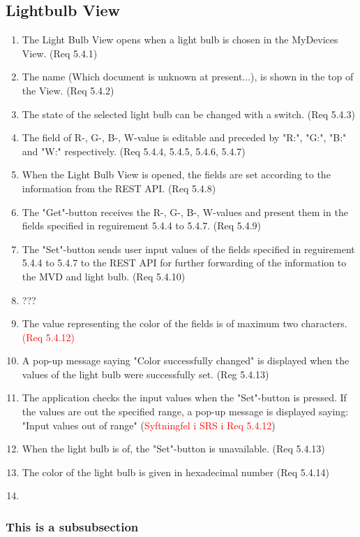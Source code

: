 \documentclass[a4paper]{article}
\newlength{\testlabellength}
\newenvironment{testlist}{\begin{enumerate}[label=\bfseries Test \thesubsection.\arabic* , labelindent=0pt, labelwidth=\testlabellength , leftmargin=2cm]}{\end{enumerate}}
\begin{document}
\begin{appendices}
\subsection{Lightbulb View}
\begin{testlist}
	\item The Light Bulb View opens when a light bulb is chosen in the MyDevices View. (Req 5.4.1)
    \item The name (Which document is unknown at present...), is shown in the top of the View. (Req 5.4.2)
    \item The state of the selected light bulb can be changed with a switch. (Req 5.4.3)
    \item The field of R-, G-, B-, W-value is editable and preceded by "R:", "G:", "B:" and "W:" respectively. (Req 5.4.4, 5.4.5, 5.4.6, 5.4.7) 
    \item When the Light Bulb View is opened, the fields are set according to the information from the REST API. (Req 5.4.8)
    \item The "Get"-button receives the R-, G-, B-, W-values and present them in the fields specified in reguirement 5.4.4 to 5.4.7. (Req 5.4.9)
    \item The "Set"-button sends user input values of the fields specified in reguirement 5.4.4 to 5.4.7 to the REST API for further forwarding of the information to the MVD and light bulb. (Req 5.4.10)
    \item ???
    \item The value representing the color of the fields is of maximum two characters. \textcolor{red}{(Req 5.4.12)}
    \item A pop-up message saying "Color successfully changed" is displayed when the values of the light bulb were successfully set. (Reg 5.4.13)
    \item The application checks the input values when the "Set"-button is pressed. If the values are out the specified range, a pop-up message is displayed saying: "Input values out of range" (\textcolor{red}{Syftningfel i SRS i Req 5.4.12})
    \item When the light bulb is of, the "Set"-button is unavailable. (Req 5.4.13)
    \item The color of the light bulb is given in hexadecimal number (Req 5.4.14)
    \item 

\end{testlist}	

\subsubsection{This is a subsubsection}


\end{appendices}
\end{document}

